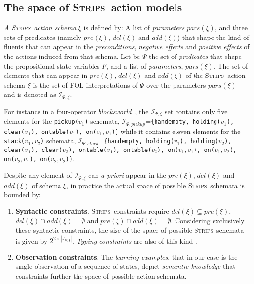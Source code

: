\documentclass{article}
\newcommand{\strips}{\textsc{Strips}}
\begin{document}
\subsection{The space of \strips\ action models}
{\em A \strips\ action schema} $\xi$ is defined by: A list of {\em parameters} $pars(\xi)$, and three sets of predicates (namely $pre(\xi)$, $del(\xi)$ and $add(\xi)$) that shape the kind of fluents that can appear in the {\em preconditions}, {\em negative effects} and {\em positive effects} of the actions induced from that schema. Let be $\Psi$ the set of {\em predicates} that shape the propositional state variables $F$, and a list of {\em parameters}, $pars(\xi)$. The set of elements that can appear in $pre(\xi)$, $del(\xi)$ and $add(\xi)$ of the \strips\ action schema $\xi$ is the set of FOL interpretations of $\Psi$ over the parameters $pars(\xi)$ and is denoted as ${\mathcal I}_{\Psi,\xi}$.

For instance in a four-operator {\em blocksworld}~\cite{slaney2001blocks}, the ${\mathcal I}_{\Psi,\xi}$ set contains only five elements for the {\small \tt pickup($v_1$)} schemata, ${\mathcal I}_{\Psi,pickup}$={\small\tt\{handempty, holding($v_1$), clear($v_1$), ontable($v_1$), on($v_1,v_1$)\}} while it contains eleven elements for the {\small \tt stack($v_1$,$v_2$)} schemata, ${\mathcal I}_{\Psi,stack}$={\small\tt\{handempty, holding($v_1$), holding($v_2$), clear($v_1$), clear($v_2$), ontable($v_1$), ontable($v_2$), on($v_1,v_1$), on($v_1,v_2$), on($v_2,v_1$), on($v_2,v_2$)\}}. 

Despite any element of ${\mathcal I}_{\Psi,\xi}$ can {\em a priori} appear in the $pre(\xi)$, $del(\xi)$ and $add(\xi)$ of schema $\xi$, in practice the actual space of possible \strips\ schemata is bounded by:
\begin{enumerate}
\item {\bf Syntactic constraints}. \strips\ constraints require $del(\xi)\subseteq pre(\xi)$, $del(\xi)\cap add(\xi)=\emptyset$ and $pre(\xi)\cap add(\xi)=\emptyset$. Considering exclusively these syntactic constraints, the size of the space of possible \strips\ schemata is given by $2^{2\times|{\mathcal I}_{\Psi,\xi}|}$. {\em Typing constraints} are also of this kind~\cite{mcdermott1998pddl}. 
\item {\bf Observation constraints}. The {\em learning examples}, that in our case is the single observation of a sequence of states, depict {\em semantic knowledge} that constraints further the space of possible action schemata.   
\end{enumerate}
\end{document}
